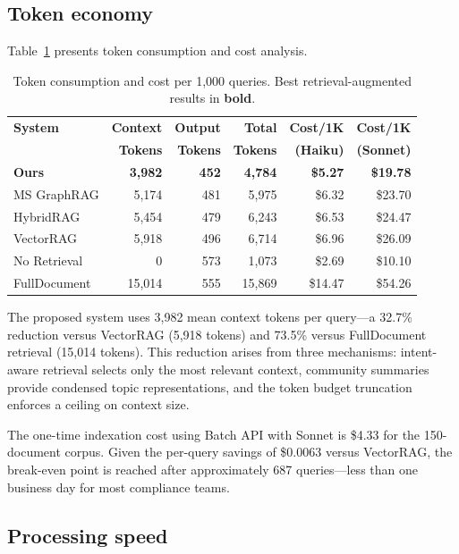\documentclass[review]{elsarticle}
\begin{document}
\subsection{Token economy}
\label{sec:res-tokens}

Table~\ref{tab:tokens} presents token consumption and cost analysis.

\begin{table}[t]
\caption{Token consumption and cost per 1,000 queries. Best retrieval-augmented results in \textbf{bold}.}
\label{tab:tokens}
\centering
\footnotesize
\begin{tabular}{@{}lrrrrr@{}}
\toprule
\textbf{System} & \textbf{Context} & \textbf{Output} & \textbf{Total} & \textbf{Cost/1K} & \textbf{Cost/1K} \\
& \textbf{Tokens} & \textbf{Tokens} & \textbf{Tokens} & \textbf{(Haiku)} & \textbf{(Sonnet)} \\
\midrule
\textbf{Ours} & \textbf{3,982} & \textbf{452} & \textbf{4,784} & \textbf{\$5.27} & \textbf{\$19.78} \\
MS GraphRAG & 5,174 & 481 & 5,975 & \$6.32 & \$23.70 \\
HybridRAG & 5,454 & 479 & 6,243 & \$6.53 & \$24.47 \\
VectorRAG & 5,918 & 496 & 6,714 & \$6.96 & \$26.09 \\
No Retrieval & 0 & 573 & 1,073 & \$2.69 & \$10.10 \\
FullDocument & 15,014 & 555 & 15,869 & \$14.47 & \$54.26 \\
\bottomrule
\end{tabular}
\end{table}

The proposed system uses 3,982 mean context tokens per query---a 32.7\% reduction versus VectorRAG (5,918 tokens) and 73.5\% versus FullDocument retrieval (15,014 tokens). This reduction arises from three mechanisms: intent-aware retrieval selects only the most relevant context, community summaries provide condensed topic representations, and the token budget truncation enforces a ceiling on context size.

The one-time indexation cost using Batch API with Sonnet is \$4.33 for the 150-document corpus. Given the per-query savings of \$0.0063 versus VectorRAG, the break-even point is reached after approximately 687 queries---less than one business day for most compliance teams.


\subsection{Processing speed}
\label{sec:res-speed}
\end{document}
